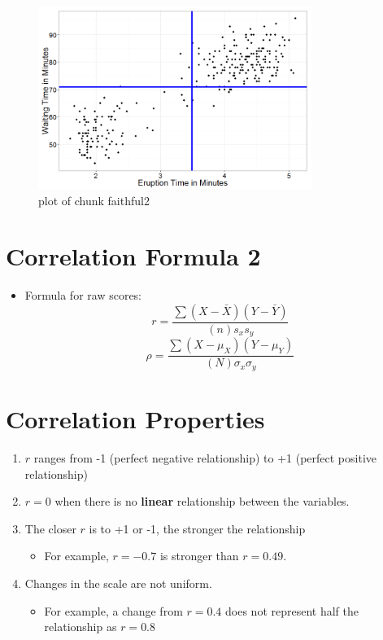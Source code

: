 \documentclass[12pt]{article}
\begin{document}
\begin{figure}[H]
\centering
\includegraphics[width=3.5in]{figure/faithful2-1.png}
\caption{plot of chunk faithful2}
\end{figure}

\section{Correlation Formula 2}\label{correlation-formula-2}

\begin{itemize}
\itemsep1pt\parskip0pt
\item
  Formula for raw scores:
  \[ r = \frac{\sum (X - \bar{X})(Y- \bar{Y})}{(n)s_{x}s_{y}} \]
  \[ \rho = \frac{\sum (X - \mu_{X})(Y- \mu_{Y})}{(N)\sigma_{x}\sigma_{y}} \]
\end{itemize}

\section{Correlation Properties}\label{correlation-properties}

\begin{enumerate}
\def\labelenumi{\arabic{enumi}.}
\itemsep1pt\parskip0pt
\item
  \(r\) ranges from -1 (perfect negative relationship) to +1 (perfect
  positive relationship)
\item
  \(r = 0\) when there is no \textbf{linear} relationship between the
  variables.
\item
  The closer \(r\) is to +1 or -1, the stronger the relationship

  \begin{itemize}
  \itemsep1pt\parskip0pt
  \item
    For example, \(r = -0.7\) is stronger than \(r = 0.49\).
  \end{itemize}
\item
  Changes in the scale are not uniform.

  \begin{itemize}
  \itemsep1pt\parskip0pt
  \item
    For example, a change from \(r = 0.4\) does not represent half the
    relationship as \(r = 0.8\)
  \end{itemize}
\end{enumerate}
\end{document}
